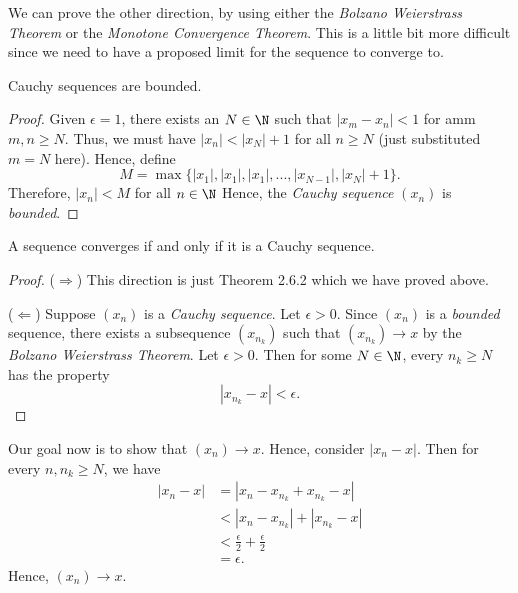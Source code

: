 We can prove the other direction, by using either the \textit{Bolzano Weierstrass Theorem} or the \textit{Monotone Convergence Theorem}. This is a little bit more difficult since we need to have a proposed limit for the sequence to converge to.  
\begin{tcolorbox}
\begin{lem}
Cauchy sequences are bounded.
\end{lem}
\end{tcolorbox}

\begin{proof}
    Given \( \epsilon = 1\), there exists an \( N \in \N \) such that \( |x_m - x_n | < 1 \) for amm \( m,n \geq N \). Thus, we must have \( |x_n| < |x_{N}| + 1 \) for all \( n \geq N \) (just substituted \(m = N \) here). Hence, define 
    \[ M = \max \{ |x_1|, |x_1|, |x_1|,..., |x_{N-1}|, |x_{N}| + 1 \}.\]
   Therefore, \( |x_n| < M \) for all \( n \in \N \) Hence, the \textit{Cauchy sequence} \((x_n)\) is \textit{bounded}.
\end{proof}

\begin{tcolorbox}
\begin{thm}
A sequence converges if and only if it is a Cauchy sequence.
\end{thm}
\end{tcolorbox}

\begin{proof}
    (\(\Rightarrow\)) This direction is just Theorem 2.6.2 which we have proved above. 

    (\( \Leftarrow\)) Suppose \((x_n)\) is a \textit{Cauchy sequence}. Let \( \epsilon > 0 \). Since \( (x_n)\) is a \textit{bounded} sequence, there exists a subsequence \((x_{n_k})\) such that \((x_{n_k}) \to x \) by the \textit{Bolzano Weierstrass Theorem}. Let \( \epsilon > 0 \). Then for some \( N \in \N \), every \( n_k \geq N \) has the property
    \[ |x_{n_k} - x| < \epsilon.\]
\end{proof}
Our goal now is to show that \( (x_n) \to x\). Hence, consider \( |x_n - x| \). Then for every \(n, n_{k} \geq N \), we have 
\begin{align*}
    |x_n - x | &= |x_n - x_{n_k} + x_{n_k} - x | \\
     &< |x_n - x_{n_k}| + |x_{n_k} - x| \\
     &< \frac{\epsilon}{2} + \frac{\epsilon}{2} \\
     &= \epsilon.
\end{align*}
Hence, \((x_n) \to x \).  

